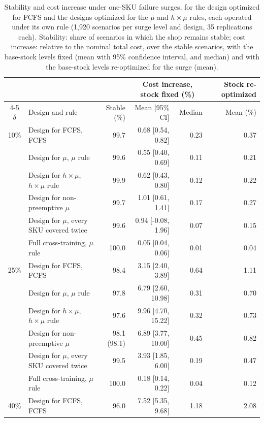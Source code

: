 \begin{table}[!htb]
\centering
\caption{Stability and cost increase under one-SKU failure surges, for the design optimized for FCFS and the designs optimized for the $\mu$ and $h\times\mu$ rules, each operated under its own rule (1,920 scenarios per surge level and design, 35 replications each). Stability: share of scenarios in which the shop remains stable; cost increase: relative to the nominal total cost, over the stable scenarios, with the base-stock levels fixed (mean with 95\% confidence interval, and median) and with the base-stock levels re-optimized for the surge (mean).}
\label{tab:stability_cost_policies}
\small
\begin{tabular}{@{}cl r rr r@{}}
\toprule
& & & \multicolumn{2}{c}{Cost increase, stock fixed (\%)} & Stock re-optimized \\
\cmidrule(lr){4-5}
$\delta$ & Design and rule & Stable (\%) & Mean [95\% CI] & Median & Mean (\%) \\
\midrule
10\% & Design for FCFS, FCFS & 99.7 & 0.68 [0.54, 0.82] & 0.23 & 0.37 \\
 & Design for $\mu$, $\mu$ rule & 99.6 & 0.55 [0.40, 0.69] & 0.11 & 0.21 \\
 & Design for $h\times\mu$, $h\times\mu$ rule & 99.9 & 0.62 [0.43, 0.80] & 0.12 & 0.22 \\
 & Design for non-preemptive $\mu$ & 99.7 & 1.01 [0.61, 1.41] & 0.17 & 0.27 \\
 & Design for $\mu$, every SKU covered twice & 99.6 & 0.94 [-0.08, 1.96] & 0.07 & 0.15 \\
 & Full cross-training, $\mu$ rule & 100.0 & 0.05 [0.04, 0.06] & 0.01 & 0.04 \\
\midrule
25\% & Design for FCFS, FCFS & 98.4 & 3.15 [2.40, 3.89] & 0.64 & 1.11 \\
 & Design for $\mu$, $\mu$ rule & 97.8 & 6.79 [2.60, 10.98] & 0.31 & 0.70 \\
 & Design for $h\times\mu$, $h\times\mu$ rule & 97.6 & 9.96 [4.70, 15.22] & 0.32 & 0.73 \\
 & Design for non-preemptive $\mu$ & 98.1 (98.1) & 6.89 [3.77, 10.00] & 0.45 & 0.82 \\
 & Design for $\mu$, every SKU covered twice & 99.5 & 3.93 [1.85, 6.00] & 0.19 & 0.47 \\
 & Full cross-training, $\mu$ rule & 100.0 & 0.18 [0.14, 0.22] & 0.04 & 0.12 \\
\midrule
40\% & Design for FCFS, FCFS & 96.0 & 7.52 [5.35, 9.68] & 1.18 & 2.08 \\

\end{tabular}
\end{table}
